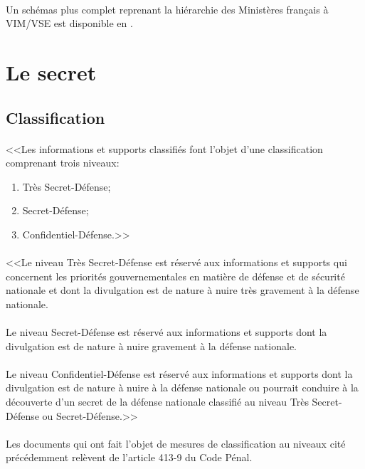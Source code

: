 \documentclass[11pt, book, english, french, standardlists]{upmethodology-document}
\begin{document}
				\paragraph*{}
					Un schémas plus complet reprenant la hiérarchie des Ministères français à VIM/VSE est disponible en .
		\section{Le secret}
			\subsection{Classification}
				\paragraph*{}
					<<Les informations et supports classifiés font l'objet d'une classification comprenant trois niveaux:
					\begin{enumerate}
						\item Très Secret-Défense;
						\item Secret-Défense;
						\item Confidentiel-Défense.>>\cite{CodeDefenseR2311-2}
					\end{enumerate}
				\paragraph*{}
					<<Le niveau Très Secret-Défense est réservé aux informations et supports qui concernent les priorités gouvernementales en matière de défense et de sécurité nationale et dont la divulgation est de nature à nuire très gravement à la défense nationale.
				\paragraph*{}
					Le niveau Secret-Défense est réservé aux informations et supports dont la divulgation est de nature à nuire gravement à la défense nationale.
				\paragraph*{}
					Le niveau Confidentiel-Défense est réservé aux informations et supports dont la divulgation est de nature à nuire à la défense nationale ou pourrait conduire à la découverte d'un secret de la défense nationale classifié au niveau Très Secret-Défense ou Secret-Défense.>>\cite{CodeDefenseR2311-3}
				\paragraph*{}
					Les documents qui ont fait l'objet de mesures de classification au niveaux cité précédemment relèvent de l'article 413-9 du Code Pénal\cite{CodePenal413-9}.
\end{document}
